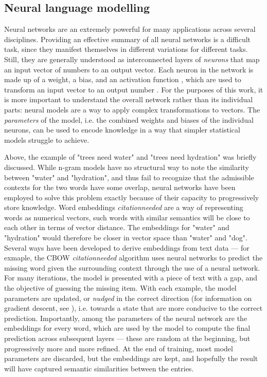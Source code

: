 \subsection{Neural language modelling}

Neural networks \citep{citationneeded} are an extremely powerful for many applications across several disciplines. Providing an effective summary of all neural networks is a difficult task, since they manifest themselves in different variations for different tasks.
Still, they are generally understood as interconnected layers of \emph{neurons} that map an input vector of numbers to an output vector. Each neuron in the network is made up of a weight, a bias, and an activation function \citep{citationneeded}, which are used to transform an input vector to an output number \citep{citationneeded}.
For the purposes of this work, it is more important to understand the overall network rather than its individual parts: neural models are a way to apply complex transformations to vectors.
The \emph{parameters} of the model, i.e. the combined weights and biases of the individual neurons, can be used to encode knowledge in a way that simpler statistical models struggle to achieve.

Above, the example of "trees need water" and "trees need hydration" was briefly discussed. While n-gram models have no structural way to note the similarity between "water" and "hydration", and thus fail to recognize that the admissible contexts for the two words have some overlap, neural networks have been employed to solve this problem exactly because of their capacity to progressively store knowledge.
Word embeddings \emph{citationneeded} are a way of representing words as numerical vectors, such words with similar semantics will be close to each other in terms of vector distance. \citep{citationneeded} The embeddings for "water" and "hydration" would therefore be closer in vector space than "water" and "dog".
Several ways have been developed to derive embeddings from text data --- for exmaple, the CBOW \emph{citationneeded} algorithm uses neural networks to predict the missing word given the surrounding context through the use of a neural network.
For many iterations, the model is presented with a piece of text with a gap, and the objective of guessing the missing item. With each example, the model parameters are updated, or \emph{nudged} in the correct direction (for information on gradient descent, see \citealp{citationneeded}), i.e. towards a state that are more conducive to the correct prediction.
Importantly, among the parameters of the neural network are the embeddings for every word, which are used by the model to compute the final prediction across subsequent layers --- these are random at the beginning, but progressively more and more refined.
At the end of training, most model parameters are discarded, but the embeddings are kept, and hopefully the result will have captured semantic similarities between the entries.

